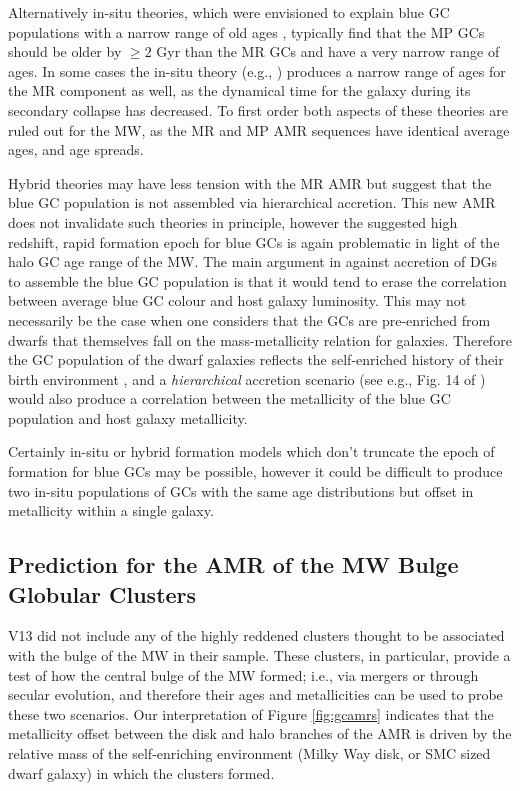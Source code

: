\documentclass[useAMS,usenatbib]{mn2e}
\begin{document}
Alternatively in-situ theories, which were envisioned to explain
blue GC populations with a narrow range of old ages \citep{Forbes97,
Beasley02}, typically find that the MP GCs should be older by $\geq 2$
 Gyr than the MR GCs and have a very narrow range of ages.
In some cases the in-situ theory (e.g., \cite{Forbes97}) 
produces a narrow range of ages for the MR component as well,
as the dynamical time for the galaxy during its secondary collapse
has decreased.
To first order both aspects of these theories are ruled out for the 
MW, as the MR and MP AMR sequences have identical average ages, and
age spreads.
 
Hybrid theories \citep{Strader05} may have less tension with the 
MR AMR but suggest that the blue GC population is not assembled
via hierarchical accretion. This new AMR does not invalidate such 
theories in principle, however the suggested high redshift, rapid formation
epoch for blue GCs is again problematic in light of the halo GC
age range of the MW.  The main argument in \cite{Strader04} 
against accretion of DGs to assemble the blue GC population is that 
it would tend to erase the correlation between average blue GC colour
and host galaxy luminosity.  This may not necessarily be
the case when one considers that the GCs are pre-enriched
from dwarfs that themselves fall on the mass-metallicity relation
for galaxies.  Therefore the GC population of the 
dwarf galaxies reflects the self-enriched history of
their birth environment \citep{Leaman12}, and a \emph{hierarchical}
accretion scenario (see e.g., Fig. 14 of \citealt{Cooper13})
would also produce a correlation 
between the metallicity of the blue GC population
and host galaxy metallicity.

Certainly in-situ or hybrid formation models which don't truncate 
the epoch of formation for blue GCs may be possible, however
it could be difficult to produce two in-situ populations of GCs
with the same age distributions but offset in metallicity within 
a single galaxy.

\subsection{Prediction for the AMR of the MW Bulge Globular Clusters}
V13 did not include any of the highly reddened clusters thought to be associated
with the bulge of the MW in their sample.  These clusters, in particular,
provide a test of how the central bulge of the MW formed; i.e., via mergers or
through secular evolution, and therefore their ages and metallicities can be
used to probe these two scenarios.  Our interpretation of Figure
\ref{fig:gcamrs} indicates that the metallicity offset between the disk and
halo branches of the AMR is driven by the relative mass of the self-enriching
environment (Milky Way disk, or SMC sized dwarf galaxy) in which the clusters
formed.  
\end{document}
